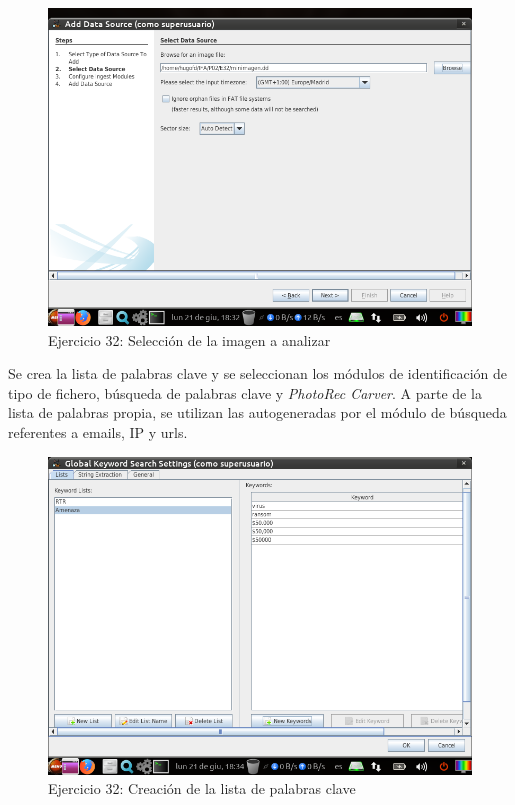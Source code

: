 \documentclass[11pt]{article}
\begin{document}
\begin{figure}[H]
    \caption{Ejercicio 32: Selección de la imagen a analizar}
  \centering
  \includegraphics[scale=0.7]{e32-2.png}
\end{figure}

Se crea la lista de palabras clave y se seleccionan los módulos de identificación de tipo de fichero, búsqueda de palabras clave y \textit{PhotoRec Carver}. A parte de la lista de palabras propia, se utilizan las autogeneradas por el módulo de búsqueda referentes a emails, IP y urls.

\begin{figure}[H]
    \caption{Ejercicio 32: Creación de la lista de palabras clave}
  \centering
  \includegraphics[scale=0.7]{e32-3.png}
\end{figure}
\end{document}
